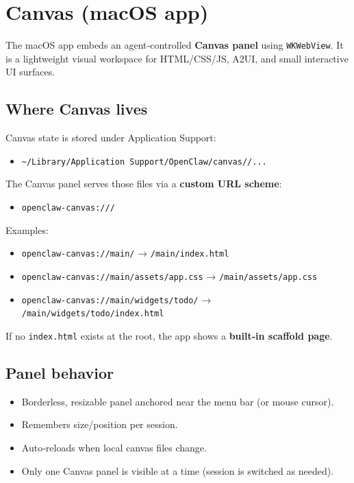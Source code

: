 \clearpage

\section{Canvas (macOS app)}


The macOS app embeds an agent‑controlled \textbf{Canvas panel} using \texttt{WKWebView}. It
is a lightweight visual workspace for HTML/CSS/JS, A2UI, and small interactive
UI surfaces.

\subsection{Where Canvas lives}


Canvas state is stored under Application Support:

\begin{itemize}
  \item \texttt{\textasciitilde{}/Library/Application Support/OpenClaw/canvas//...}
\end{itemize}


The Canvas panel serves those files via a \textbf{custom URL scheme}:

\begin{itemize}
  \item \texttt{openclaw-canvas:///}
\end{itemize}


Examples:

\begin{itemize}
  \item \texttt{openclaw-canvas://main/} → \texttt{/main/index.html}
  \item \texttt{openclaw-canvas://main/assets/app.css} → \texttt{/main/assets/app.css}
  \item \texttt{openclaw-canvas://main/widgets/todo/} → \texttt{/main/widgets/todo/index.html}
\end{itemize}


If no \texttt{index.html} exists at the root, the app shows a \textbf{built‑in scaffold page}.

\subsection{Panel behavior}


\begin{itemize}
  \item Borderless, resizable panel anchored near the menu bar (or mouse cursor).
  \item Remembers size/position per session.
  \item Auto‑reloads when local canvas files change.
  \item Only one Canvas panel is visible at a time (session is switched as needed).
\end{itemize}


